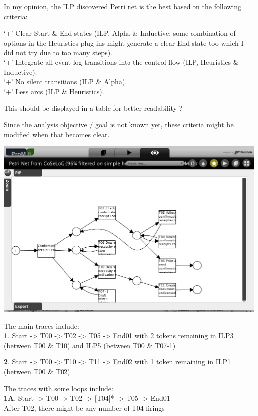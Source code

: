\documentclass[]{article}
\begin{document}
In my opinion, the ILP discovered Petri net is the best based on the
following criteria:

`+' Clear Start \& End states (ILP, Alpha \& Inductive; some combination
of options in the Heuristics plug-ins might generate a clear End state
too which I did not try due to too many steps).\\`+' Integrate all event
log transitions into the control-flow (ILP, Heuristics \&
Inductive).\\`+' No silent transitions (ILP \& Alpha).\\`+' Less arcs
(ILP \& Heuristics).

This should be displayed in a table for better readability ?

Since the analysis objective / goal is not known yet, these criteria
might be modified when that becomes clear.

\includegraphics{CoSeLoG_Step_05_Filter96_PetriNet_ILP.png}

The main traces include:\\\textbf{1}. Start -\textgreater{} T00
-\textgreater{} T02 -\textgreater{} T05 -\textgreater{} End01 with 2
tokens remaining in ILP3 (between T00 \& T10) and ILP5 (between T00 \&
T07-1)

\textbf{2}. Start -\textgreater{} T00 -\textgreater{} T10
-\textgreater{} T11 -\textgreater{} End02 with 1 token remaining in ILP1
(between T00 \& T02)

The traces with some loops include:\\\textbf{1A}. Start -\textgreater{}
T00 -\textgreater{} T02 -\textgreater{} {[}T04{]}* -\textgreater{} T05
-\textgreater{} End01\\ After T02, there might be any number of T04
firings
\end{document}
